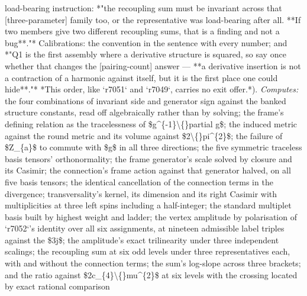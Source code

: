 \begin{description}
load-bearing instruction: *"the recoupling sum must be invariant across that [three-parameter] family too, or the representative was load-bearing after all. **If two members give two different recoupling sums, that is a finding and not a bug**."*  Calibrations: the convention in the sentence with every number; and *"Q1 is the first assembly where a derivative structure is squared, so say once whether that changes the [pairing-count] answer --- **a derivative insertion is not a contraction of a harmonic against itself, but it is the first place one could hide**."*  *This order, like `r7051` and `r7049`, carries no exit offer.*). 
\emph{Computes:} the four combinations of invariant side and generator sign against the banked structure constants, read off algebraically rather than by solving; the frame's defining relation as the tracelessness of \$g\textasciicircum{}\{-1\}\textbackslash\{\}partial g\$; the induced metric against the round metric and its volume against \$2\textbackslash\{\}pi\textasciicircum{}\{2\}\$; the failure of \$Z\_\{a\}\$ to commute with \$g\$ in all three directions; the five symmetric traceless basis tensors' orthonormality; the frame generator's scale solved by closure and its Casimir; the connection's frame action against that generator halved, on all five basis tensors; the identical cancellation of the connection terms in the divergence; transversality's kernel, its dimension and its right Casimir with multiplicities at three left spins including a half-integer; the standard multiplet basis built by highest weight and ladder; the vertex amplitude by polarisation of `r7052`'s identity over all six assignments, at nineteen admissible label triples against the \$3j\$; the amplitude's exact trilinearity under three independent scalings; the recoupling sum at six odd levels under three representatives each, with and without the connection terms; the sum's log-slope across three brackets; and the ratio against \$2c\_\{4\}\textbackslash\{\}mu\textasciicircum{}\{2\}\$ at six levels with the crossing located by exact rational comparison

\end{description}
